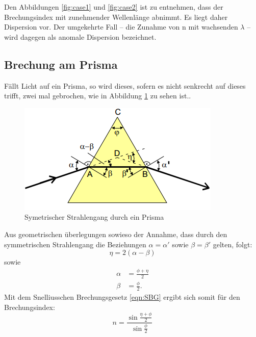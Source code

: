 \newline
Den Abbildungen \ref{fig:case1} und \ref{fig:case2} ist zu entnehmen, dass der Brechungsindex mit zunehmender Wellenlänge abnimmt. Es liegt daher Dispersion vor.
Der umgekehrte Fall – die Zunahme von n mit wachsenden $\lambda$ – wird dagegen als anomale Dispersion bezeichnet.


\subsection{Brechung am Prisma}\label{sec:brech}
Fällt Licht auf ein Prisma, so wird dieses, sofern es nicht senkrecht auf dieses trifft, zwei mal gebrochen, wie in Abbildung \ref{fig:BaP} zu sehen ist..
\begin{figure}[H]
  \centering
  \includegraphics[scale=0.7]{Text/Bilder/Brechung3.PNG}
  \caption{Symetrischer Strahlengang durch ein Prisma \cite[23]{sample}}
  \label{fig:BaP}
\end{figure}
Aus geometrischen überlegungen sowieso der Annahme, dass durch den symmetrischen Strahlengang die Beziehungen $\alpha=\alpha'$ sowie $\beta=\beta'$ gelten,   folgt:
\begin{equation}
  \eta=2 \left(\alpha-\beta \right)
\end{equation}
sowie
\begin{align}
  \alpha &= \frac{\phi + \eta}{2} \\
  \beta  &= \frac{\phi}{2} \text{.}
\end{align}
Mit dem Snelliusschen Brechungsgesetz \eqref{eqn:SBG} ergibt sich somit für den Brechungsindex:
\begin{equation}
n = \frac{\sin\frac{\eta +\phi}{2}}{\sin\frac{\phi}{2}}\label{eq:n}
\end{equation}

